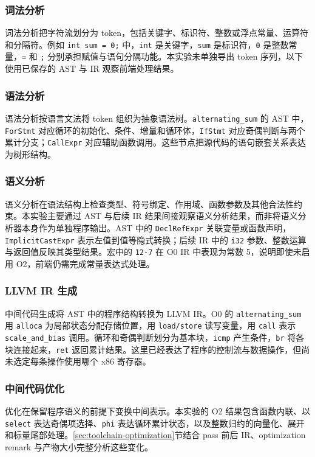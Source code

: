 \subsubsection{词法分析}
\label{sec:toolchain-lexing}
词法分析把字符流划分为 token，包括关键字、标识符、整数或浮点常量、运算符和分隔符。例如 \texttt{int sum = 0;} 中，\texttt{int} 是关键字，\texttt{sum} 是标识符，\texttt{0} 是整数常量，\texttt{=} 和 \texttt{;} 分别承担赋值与语句分隔功能。本实验未单独导出 token 序列，以下使用已保存的 AST 与 IR 观察前端处理结果。

\subsubsection{语法分析}
\label{sec:toolchain-parsing}
语法分析按语言文法将 token 组织为抽象语法树。\texttt{alternating\_sum} 的 AST 中，\texttt{ForStmt} 对应循环的初始化、条件、增量和循环体，\texttt{IfStmt} 对应奇偶判断与两个累计分支；\texttt{CallExpr} 对应辅助函数调用。这些节点把源代码的语句嵌套关系表达为树形结构。

\subsubsection{语义分析}
\label{sec:toolchain-semantics}
语义分析在语法结构上检查类型、符号绑定、作用域、函数参数及其他合法性约束。本实验主要通过 AST 与后续 IR 结果间接观察语义分析结果，而非将语义分析器本身作为单独程序输出。AST 中的 \texttt{DeclRefExpr} 关联变量或函数声明，\texttt{ImplicitCastExpr} 表示左值到值等隐式转换；后续 IR 中的 \texttt{i32} 参数、整数运算与返回值反映其类型结果。宏中的 \texttt{12-7} 在 O0 IR 中表现为常数 5，说明即使未启用 O2，前端仍需完成常量表达式处理。

\subsubsection{LLVM IR 生成}
\label{sec:toolchain-ir-generation}
中间代码生成将 AST 中的程序结构转换为 LLVM IR。O0 的 \texttt{alternating\_sum} 用 \texttt{alloca} 为局部状态分配存储位置，用 \texttt{load/store} 读写变量，用 \texttt{call} 表示 \texttt{scale\_and\_bias} 调用。循环和奇偶判断划分为基本块，\texttt{icmp} 产生条件，\texttt{br} 将各块连接起来，\texttt{ret} 返回累计结果。这里已经表达了程序的控制流与数据操作，但尚未选定每条操作使用哪个 x86 寄存器。

\subsubsection{中间代码优化}
\label{sec:toolchain-ir-optimization}
优化在保留程序语义的前提下变换中间表示。本实验的 O2 结果包含函数内联、以 \texttt{select} 表达奇偶项选择、\texttt{phi} 表达循环累计状态，以及整数归约的向量化、展开和标量尾部处理。\ref{sec:toolchain-optimization}节结合 pass 前后 IR、optimization remark 与产物大小完整分析这些变化。

